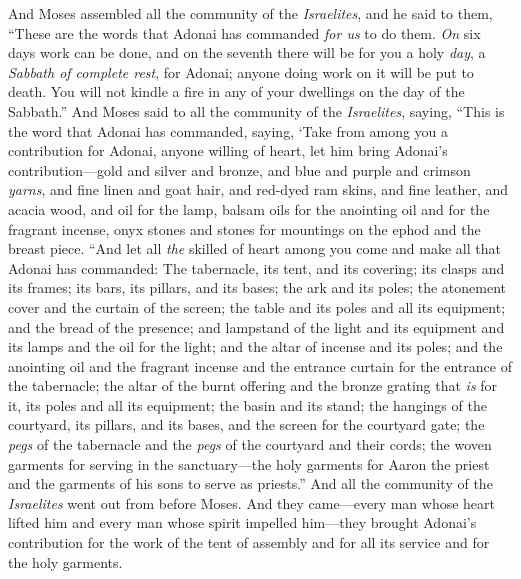 \begin{biblechapter} %
 And Moses assembled all the community of the \textit{Israelites}, and he said to them, “These are the words that Adonai has commanded \textit{for us} to do them.
\verse \textit{On} six days work can be done, and on the seventh there will be for you a holy \textit{day}, a \textit{Sabbath of complete rest}, for Adonai; anyone doing work on it will be put to death.
\verse You will not kindle a fire in any of your dwellings on the day of the Sabbath.”
\verse And Moses said to all the community of the \textit{Israelites}, saying, “This is the word that Adonai has commanded, saying,
\verse ‘Take from among you a contribution for Adonai, anyone willing of heart, let him bring Adonai’s contribution—gold and silver and bronze,
\verse and blue and purple and crimson \textit{yarns}, and fine linen and goat hair,
\verse and red-dyed ram skins, and fine leather, and acacia wood,
\verse and oil for the lamp, balsam oils for the anointing oil and for the fragrant incense,
\verse onyx stones and stones for mountings on the ephod and the breast piece.
\verse “And let all \textit{the} skilled of heart among you come and make all that Adonai has commanded:
\verse The tabernacle, its tent, and its covering; its clasps and its frames; its bars, its pillars, and its bases;
\verse the ark and its poles; the atonement cover and the curtain of the screen;
\verse the table and its poles and all its equipment; and the bread of the presence;
\verse and lampstand of the light and its equipment and its lamps and the oil for the light;
\verse and the altar of incense and its poles; and the anointing oil and the fragrant incense and the entrance curtain for the entrance of the tabernacle;
\verse the altar of the burnt offering and the bronze grating that \textit{is} for it, its poles and all its equipment; the basin and its stand;
\verse the hangings of the courtyard, its pillars, and its bases, and the screen for the courtyard gate;
\verse the \textit{pegs} of the tabernacle and the \textit{pegs} of the courtyard and their cords;
\verse the woven garments for serving in the sanctuary—the holy garments for Aaron the priest and the garments of his sons to serve as priests.”
\verse And all the community of the \textit{Israelites} went out from before Moses.
\verse And they came—every man whose heart lifted him and every man whose spirit impelled him—they brought Adonai’s contribution for the work of the tent of assembly and for all its service and for the holy garments.

\end{biblechapter}
